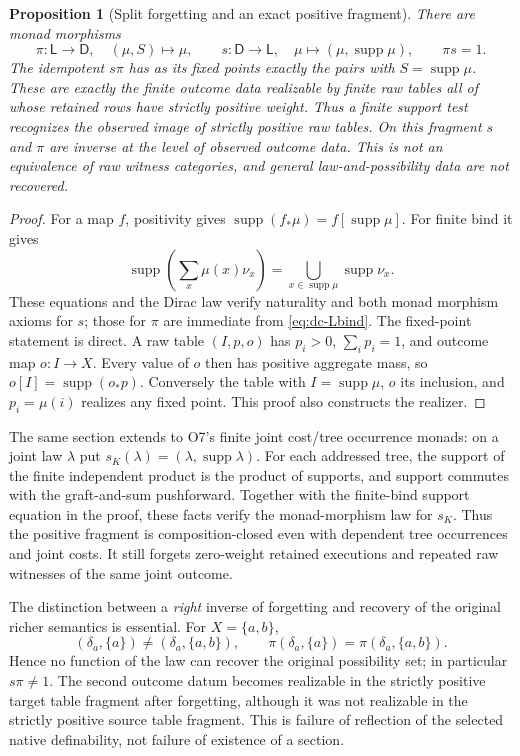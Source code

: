 \documentclass[11pt]{article}
\newtheorem{proposition}[theorem]{Proposition}
\theoremstyle{definition}
\theoremstyle{remark}
\begin{document}
\begin{proposition}[Split forgetting and an exact positive fragment]
\label{prop:dc-law-section}
There are monad morphisms
\[
 \pi:\mathsf L\longrightarrow\mathsf D,\quad(\mu,S)\mapsto\mu,
 \qquad
 s:\mathsf D\longrightarrow\mathsf L,\quad
       \mu\mapsto(\mu,\operatorname{supp}\mu),
 \qquad \pi s=1.
\]
The idempotent $s\pi$ has as its fixed points exactly the pairs with
$S=\operatorname{supp}\mu$. These are exactly the finite outcome data realizable
by finite raw tables all of whose retained rows have strictly positive
weight. Thus a finite support test recognizes the observed image of strictly
positive raw tables. On this fragment $s$ and $\pi$ are inverse at the level of
observed outcome data. This is not an equivalence of raw witness categories,
and general law-and-possibility data are not recovered.
\end{proposition}
\begin{proof}
For a map $f$, positivity gives
$\operatorname{supp}(f_*\mu)=f[\operatorname{supp}\mu]$.
For finite bind it gives
\[
 \operatorname{supp}\left(\sum_x\mu(x)\nu_x\right)
  =\bigcup_{x\in\operatorname{supp}\mu}\operatorname{supp}\nu_x.
\]
These equations and the Dirac law verify naturality and both monad
morphism axioms for $s$; those for $\pi$ are immediate from
\eqref{eq:dc-Lbind}. The fixed-point statement is direct.
A raw table $(I,p,o)$ has $p_i>0$, $\sum_i p_i=1$, and outcome map
$o:I\to X$. Every value of $o$ then has positive aggregate mass, so
$o[I]=\operatorname{supp}(o_*p)$. Conversely the table with
$I=\operatorname{supp}\mu$, $o$ its inclusion, and $p_i=\mu(i)$
realizes any fixed point. This proof also constructs the realizer.
\end{proof}

The same section extends to O7's finite joint cost/tree occurrence
monads: on a joint law $\lambda$ put
$s_K(\lambda)=(\lambda,\operatorname{supp}\lambda)$.
For each addressed tree, the support of the finite independent product
is the product of supports, and support commutes with the graft-and-sum
pushforward. Together with the finite-bind support equation in the proof,
these facts verify the monad-morphism law for $s_K$. Thus the positive
fragment is composition-closed even with dependent tree occurrences and
joint costs. It still forgets zero-weight retained executions and repeated
raw witnesses of the same joint outcome.

The distinction between a \emph{right} inverse of forgetting and recovery
of the original richer semantics is essential. For $X=\{a,b\}$,
\[
 (\delta_a,\{a\})\ne(\delta_a,\{a,b\}),\qquad
 \pi(\delta_a,\{a\})=\pi(\delta_a,\{a,b\}).
\]
Hence no function of the law can recover the original possibility set;
in particular $s\pi\ne1$. The second outcome datum becomes realizable in the
strictly positive target table fragment after forgetting, although it was
not realizable in the strictly positive source table fragment. This is failure of
reflection of the selected native definability, not failure of existence
of a section.
\end{document}
